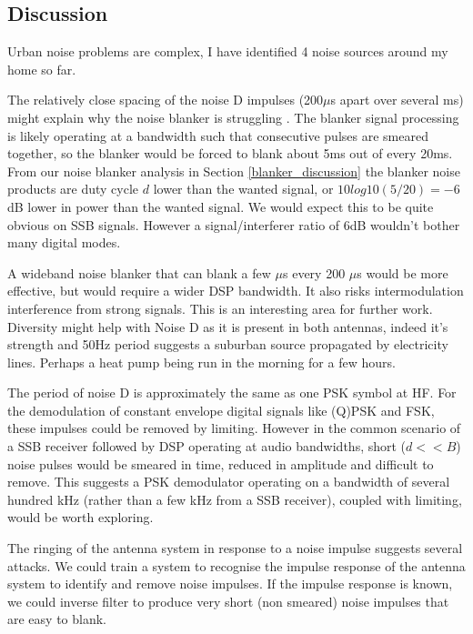 \documentclass{article}
\begin{document}
\subsection{Discussion}

Urban noise problems are complex, I have identified 4 noise sources around my home so far.

The relatively close spacing of the noise D impulses (200$\mu$s apart over several ms) might explain why the noise blanker is struggling \cite{sm5bsz_blanker}.  The blanker signal processing is likely operating at a bandwidth such that consecutive pulses are smeared together, so the blanker would be forced to blank about 5ms out of every 20ms. From our noise blanker analysis in Section \ref{blanker_discussion} the blanker noise products are duty cycle $d$ lower than the wanted signal, or $10log10(5/20)=-6$ dB lower in power than the wanted signal.  We would expect this to be quite obvious on SSB signals.  However a signal/interferer ratio of 6dB wouldn't bother many digital modes.

A wideband noise blanker that can blank a few $\mu$s every 200 $\mu$s would be more effective, but would require a wider DSP bandwidth.  It also risks intermodulation interference from strong signals.  This is an interesting area for further work.  Diversity might help with Noise D as it is present in both antennas, indeed it's strength and 50Hz period suggests a suburban source propagated by electricity lines.  Perhaps a heat pump being run in the morning for a few hours.

The period of noise D is approximately the same as one PSK symbol at HF.  For the demodulation of constant envelope digital signals like (Q)PSK and FSK, these impulses could be removed by limiting.  However in the common scenario of a SSB receiver followed by DSP operating at audio bandwidths, short ($d<<B$) noise pulses would be smeared in time, reduced in amplitude and difficult to remove.  This suggests a PSK demodulator operating on a bandwidth of several hundred kHz (rather than a few kHz from a SSB receiver), coupled with limiting, would be worth exploring.

The ringing of the antenna system in response to a noise impulse suggests several attacks. We could train a system to recognise the impulse response of the antenna system to identify and remove noise impulses.  If the impulse response is known, we could inverse filter to produce very short (non smeared) noise impulses that are easy to blank.



\end{document}
